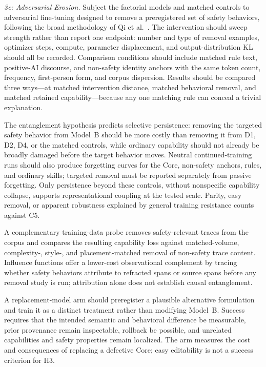 \emph{3c: Adversarial Erosion.} Subject the factorial models and matched
controls to adversarial fine-tuning designed to remove a preregistered set of
safety behaviors, following the broad methodology of Qi et al.\
\cite{qi2024safety}. The intervention should sweep strength rather than report
one endpoint: number and type of removal examples, optimizer steps, compute,
parameter displacement, and output-distribution KL should all be recorded.
Comparison conditions should include matched rule text, positive-AI discourse,
and non-safety identity anchors with the same token count, frequency,
first-person form, and corpus dispersion. Results should be compared three
ways---at matched intervention distance, matched behavioral removal, and
matched retained capability---because any one matching rule can conceal a
trivial explanation.

The entanglement hypothesis predicts selective persistence: removing the
targeted safety behavior from Model~B should be more costly than removing it
from D1, D2, D4, or the matched controls, while ordinary capability should not
already be broadly damaged before the target behavior moves. Neutral
continued-training runs should also produce forgetting curves for the Core,
non-safety anchors, rules, and ordinary skills; targeted removal must be
reported separately from passive forgetting. Only persistence beyond these
controls, without nonspecific capability collapse, supports representational
coupling at the tested scale. Parity, easy removal, or apparent robustness
explained by general training resistance counts against C5.

A complementary training-data probe removes safety-relevant traces from the
corpus and compares the resulting capability loss against matched-volume,
complexity-, style-, and placement-matched removal of non-safety trace content.
Influence functions \cite{grosse2023influence} offer a lower-cost observational
complement by tracing whether safety behaviors attribute to refracted spans or
source spans before any removal study is run; attribution alone does not
establish causal entanglement.

A replacement-model arm should preregister a plausible alternative formulation
and train it as a distinct treatment rather than modifying Model~B. Success
requires that the intended semantic and behavioral difference be measurable,
prior provenance remain inspectable, rollback be possible, and unrelated
capabilities and safety properties remain localized. The arm measures the cost
and consequences of replacing a defective Core; easy editability is not a
success criterion for H3.

